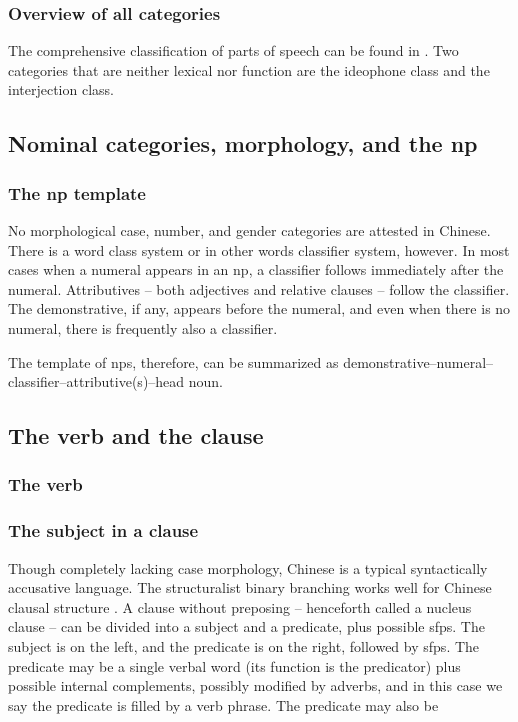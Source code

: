 \documentclass[UTF8, a4paper, oneside, scheme=plain]{ctexart}
\newcommand*{\citesec}[1]{\S~{#1}}
\begin{document}
\subsubsection{Overview of all categories}

The comprehensive classification of parts of speech can be found in \citet[\citesec{3.6}]{zhudexigrammar}.
Two categories that are neither lexical nor function 
are the ideophone class and the interjection class.


\subsection{Nominal categories, morphology, and the \ac{np}}

\subsubsection{The \ac{np} template}

No morphological case, number, and gender categories are attested in Chinese.
There is a word class system or in other words classifier system, however.
In most cases when a numeral appears in an \ac{np},
a classifier follows immediately after the numeral.
Attributives -- both adjectives and relative clauses -- 
follow the classifier. %
The demonstrative, if any, appears before the numeral,
and even when there is no numeral,
there is frequently also a classifier.

The template of \ac{np}s, therefore, can be summarized as 
demonstrative--numeral--classifier--attributive(s)--head noun.

\subsection{The verb and the clause}

\subsubsection{The verb}



\subsubsection{The subject in a clause}

Though completely lacking case morphology,
Chinese is a typical syntactically accusative language.
The structuralist binary branching works well for Chinese clausal structure 
\citep[\citesec{133-136}]{zhudexigrammar}.
A clause without preposing -- henceforth called a nucleus clause --
can be divided into a subject and a predicate,
plus possible \ac{sfp}s.
The subject is on the left, and the predicate is on the right, followed by \ac{sfp}s.
The predicate may be a 
single verbal word (its function is the predicator) plus possible internal complements, 
possibly modified by adverbs,
and in this case we say the predicate is filled by a verb phrase.
The predicate may also be 
\end{document}
